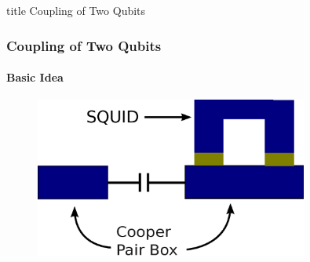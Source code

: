 \documentclass{beamer}
\begin{document}

\begin{frame}
    \vfill
    \centering
    \begin{beamercolorbox}[sep=8pt,center,shadow=true,rounded=true]{title}
        Coupling of Two Qubits
    \end{beamercolorbox}
    \vfill
\end{frame}


\begin{frame}
    \frametitle{Coupling of Two Qubits}
    \framesubtitle{Basic Idea}
    \begin{figure}[!htb]
        \centering
        \includegraphics[width=0.8\textwidth]{img/basic-structure.eps}
    \end{figure}
\end{frame}

\end{document}
